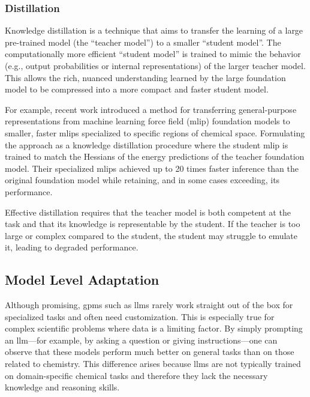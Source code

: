 \subsubsection{Distillation}

Knowledge distillation is a technique that aims to transfer the learning of a large pre-trained model (the \enquote{teacher model}) to a smaller \enquote{student model}. \autocite{hinton2015distilling}
The computationally more efficient \enquote{student model} is trained to mimic the behavior (e.g., output probabilities or internal representations) of the larger teacher model. 
This allows the rich, nuanced understanding learned by the large foundation model to be compressed into a more compact and faster student model.\autocite{sanh2019distilbert}

For example, recent work introduced a method for transferring general-purpose representations from machine learning force field (\gls{mlip}) foundation models to smaller, faster \glspl{mlip} specialized to specific regions of chemical space. Formulating the approach as a knowledge distillation procedure where the student \gls{mlip} is trained to match the Hessians of the energy predictions of the teacher foundation model. \autocite{amin2025towards}
Their specialized \glspl{mlip} achieved up to 20 times faster inference than the original foundation model while retaining, and in some cases exceeding, its performance.


Effective distillation requires that the teacher model is both competent at the task and that its knowledge is representable by the student. 
If the teacher is too large or complex compared to the student, the student may struggle to emulate it, leading to degraded performance. \autocite{liu2024wisdom}



\subsection{Model Level Adaptation}
\label{sec:model_adaptation}
Although promising, \glspl{gpm} such as \glspl{llm} rarely work straight out of the box for specialized tasks and often need customization. This is especially true for complex scientific problems where data is a limiting factor. 
By simply prompting an \gls{llm}---for example, by asking a question or giving instructions---one can observe that these models perform much better on general tasks than on those related to chemistry. 
This difference arises because \glspl{llm} are not typically trained on domain-specific chemical tasks and therefore they lack the necessary knowledge and reasoning skills. 

